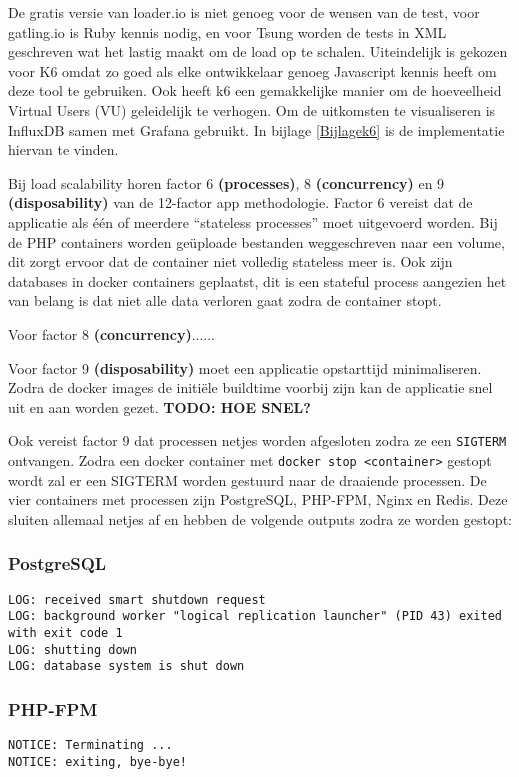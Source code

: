De gratis versie van loader.io is niet genoeg voor de wensen van de test, voor gatling.io is Ruby kennis nodig, en voor Tsung worden de tests in XML geschreven wat het lastig maakt om de load op te schalen. Uiteindelijk is gekozen voor K6 omdat zo goed als elke ontwikkelaar genoeg Javascript kennis heeft om deze tool te gebruiken. Ook heeft k6 een gemakkelijke manier om de hoeveelheid Virtual Users (VU) geleidelijk te verhogen. Om de uitkomsten te visualiseren is InfluxDB samen met Grafana gebruikt. In bijlage \ref{Bijlagek6} is de implementatie hiervan te vinden.

Bij load scalability horen factor 6 \textbf{(processes)}, 8 \textbf{(concurrency)} en 9 \textbf{(disposability)} van de 12-factor app methodologie. Factor 6 vereist dat de applicatie als één of meerdere \enquote{stateless processes} moet uitgevoerd worden. Bij de PHP containers worden geüploade bestanden weggeschreven naar een volume, dit zorgt ervoor dat de container niet volledig stateless meer is. Ook zijn databases in docker containers geplaatst, dit is een stateful process aangezien het van belang is dat niet alle data verloren gaat zodra de container stopt.

Voor factor 8 \textbf{(concurrency)}......

Voor factor 9 \textbf{(disposability)} moet een applicatie opstarttijd minimaliseren. Zodra de docker images de initiële buildtime voorbij zijn kan de applicatie snel uit en aan worden gezet. \textbf{TODO: HOE SNEL?} %

Ook vereist factor 9 dat processen netjes worden afgesloten zodra ze een \texttt{SIGTERM} ontvangen. Zodra een docker container met \texttt{docker stop <container>} gestopt wordt zal er een SIGTERM worden gestuurd naar de draaiende processen. De vier containers met processen zijn PostgreSQL, PHP-FPM, Nginx en Redis. Deze sluiten allemaal netjes af en hebben de volgende outputs zodra ze worden gestopt:

\subsubsection{PostgreSQL}
\begin{verbatim}
LOG: received smart shutdown request
LOG: background worker "logical replication launcher" (PID 43) exited with exit code 1
LOG: shutting down
LOG: database system is shut down
\end{verbatim}

\subsubsection{PHP-FPM}
\begin{verbatim}
NOTICE: Terminating ...
NOTICE: exiting, bye-bye!
\end{verbatim}

